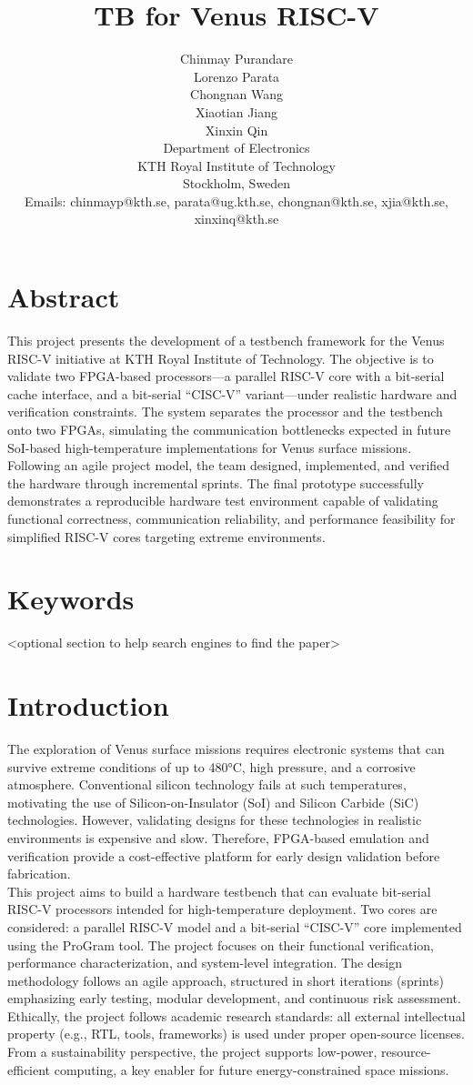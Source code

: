 \documentclass[10pt,twocolumn]{article}
\title{\textbf{TB for Venus RISC-V}\\[0.5em]}
\author{Chinmay Purandare\\
Lorenzo Parata\\
Chongnan Wang\\
Xiaotian Jiang \\
Xinxin Qin \\
Department of Electronics\\
KTH Royal Institute of Technology\\
Stockholm, Sweden\\
Emails: chinmayp@kth.se, parata@ug.kth.se, chongnan@kth.se, xjia@kth.se, xinxinq@kth.se}
\date{}
\begin{document}
\maketitle

\section*{Abstract}
This project presents the development of a testbench framework for the Venus RISC-V initiative at KTH Royal Institute of Technology. The objective is to validate two FPGA-based processors—a parallel RISC-V core with a bit-serial cache interface, and a bit-serial “CISC-V” variant—under realistic hardware and verification constraints. The system separates the processor and the testbench onto two FPGAs, simulating the communication bottlenecks expected in future SoI-based high-temperature implementations for Venus surface missions. Following an agile project model, the team designed, implemented, and verified the hardware through incremental sprints. The final prototype successfully demonstrates a reproducible hardware test environment capable of validating functional correctness, communication reliability, and performance feasibility for simplified RISC-V cores targeting extreme environments.

\section*{Keywords}
<optional section to help search engines to find the paper>

\section{Introduction}
The exploration of Venus surface missions requires electronic systems that can survive extreme conditions of up to 480°C, high pressure, and a corrosive atmosphere. Conventional silicon technology fails at such temperatures, motivating the use of Silicon-on-Insulator (SoI) and Silicon Carbide (SiC) technologies. However, validating designs for these technologies in realistic environments is expensive and slow. Therefore, FPGA-based emulation and verification provide a cost-effective platform for early design validation before fabrication.\\
This project aims to build a hardware testbench that can evaluate bit-serial RISC-V processors intended for high-temperature deployment. Two cores are considered: a parallel RISC-V model and a bit-serial “CISC-V” core implemented using the ProGram tool. The project focuses on their functional verification, performance characterization, and system-level integration. The design methodology follows an agile approach, structured in short iterations (sprints) emphasizing early testing, modular development, and continuous risk assessment.\\
Ethically, the project follows academic research standards: all external intellectual property (e.g., RTL, tools, frameworks) is used under proper open-source licenses. From a sustainability perspective, the project supports low-power, resource-efficient computing, a key enabler for future energy-constrained space missions.
\end{document}
